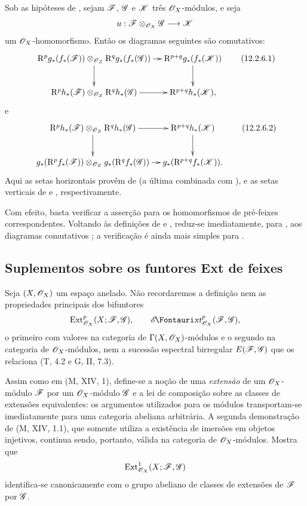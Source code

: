 \begin{env}[12.2.6]
\label{0.12.2.6}
Sob as hipóteses de , sejam $\mathscr{F}$, $\mathscr{G}$
e $\mathscr{K}$ três $\mathscr{O}_X$-módulos, e seja
\[
  u:\mathscr{F}\otimes_{\mathscr{O}_X}\mathscr{G}\longrightarrow\mathscr{K}
\]
um $\mathscr{O}_X$-homomorfismo.
Então os diagramas seguintes são comutativos:
\[
  \xymatrix@C=10pt@R=24pt{
    \RR^p g_*(f_*(\sh{F}))
      \otimes_{\sh{O}_Z}\RR^q g_*(f_*(\sh{G}))
      \ar[r]\ar[d]
      & \RR^{p+q}g_*(f_*(\sh{K}))\ar[d]\\
    \RR^p h_*(\sh{F})
      \otimes_{\sh{O}_Z}\RR^q h_*(\sh{G})
      \ar[r]
      & \RR^{p+q}h_*(\sh{K}),
  }
  \tag{12.2.6.1}
  \label{0.12.2.6.1}
\]
e
\[
  \xymatrix@C=10pt@R=24pt{
    \RR^p h_*(\sh{F})
      \otimes_{\sh{O}_Z}\RR^q h_*(\sh{G})
      \ar[r]\ar[d]
      & \RR^{p+q}h_*(\sh{K})\ar[d]\\
    g_*(\RR^p f_*(\sh{F}))
      \otimes_{\sh{O}_Z}g_*(\RR^q f_*(\sh{G}))
      \ar[r]
      & g_*(\RR^{p+q}f_*(\sh{K})).
  }
  \tag{12.2.6.2}
  \label{0.12.2.6.2}
\]
Aqui as setas horizontais provêm de  (a última
combinada com ), e as setas
verticais de  e , respectivamente.

Com efeito, basta verificar a asserção para os homomorfismos de pré-feixes
correspondentes.  Voltando às definições de
 e , reduz-se imediatamente, para
, aos diagramas comutativos
; a verificação é ainda mais simples para
.
\end{env}

\subsection{Suplementos sobre os funtores Ext de feixes}
\label{subsection:0.12.3}

\begin{env}[12.3.1]
\label{0.12.3.1}
Seja $(X,\mathscr{O}_X)$ um espaço anelado.
Não recordaremos a definição nem as propriedades principais dos
bifuntores
\[
  \Ext^p_{\sh{O}_X}(X;\sh{F},\sh{G}),
  \qquad
  \shExt^p_{\sh{O}_X}(\sh{F},\sh{G}),
\]
o primeiro com valores na categoria de
$\Gamma(X,\mathscr{O}_X)$-módulos e o segundo na categoria de
$\mathscr{O}_X$-módulos, nem a sucessão espectral birregular
$E(\mathscr{F},\mathscr{G})$ que os relaciona (T, 4.2 e G, II, 7.3).
\end{env}

\begin{env}[12.3.2]
\label{0.12.3.2}
Assim como em (M, XIV, 1), define-se a noção de uma
\emph{extensão} de um $\mathscr{O}_X$-módulo $\mathscr{F}$ por um
$\mathscr{O}_X$-módulo $\mathscr{G}$ e a lei de composição sobre as classes de
extensões equivalentes: os argumentos utilizados para os módulos
transportam-se imediatamente para uma categoria abeliana arbitrária.
A segunda demonstração de (M, XIV, 1.1), que somente utiliza a existência de
imersões em objetos injetivos, continua sendo, portanto, válida na
categoria de $\mathscr{O}_X$-módulos.  Mostra que
\[
  \operatorname{Ext}^1_{\mathscr{O}_X}(X;\mathscr{F},\mathscr{G})
\]
identifica-se canonicamente com o grupo abeliano de classes de
extensões de $\mathscr{F}$ por $\mathscr{G}$.
\end{env}

